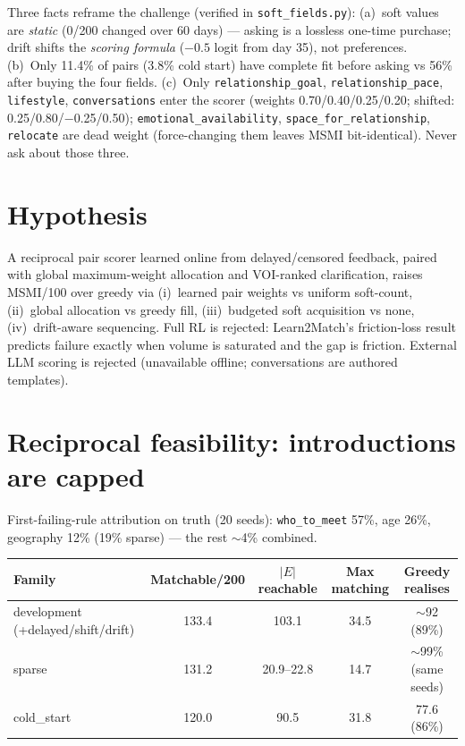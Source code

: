 \documentclass[11pt,a4paper]{article}
\begin{document}
Three facts reframe the challenge (verified in \texttt{soft\_fields.py}):
(a)~soft values are \emph{static} (0/200 changed over 60 days) --- asking is a
lossless one-time purchase; drift shifts the \emph{scoring formula} ($-0.5$
logit from day 35), not preferences. (b)~Only 11.4\% of pairs (3.8\% cold
start) have complete fit before asking vs 56\% after buying the four fields.
(c)~Only \texttt{relationship\_goal}, \texttt{relationship\_pace},
\texttt{lifestyle}, \texttt{conversations} enter the scorer (weights
0.70/0.40/0.25/0.20; shifted: 0.25/0.80/\textbf{$-$}0.25/0.50);
\texttt{emotional\_availability}, \texttt{space\_for\_relationship},
\texttt{relocate} are dead weight (force-changing them leaves MSMI
bit-identical). Never ask about those three.

\section{Hypothesis}
A reciprocal pair scorer learned online from delayed/censored feedback, paired
with global maximum-weight allocation and VOI-ranked clarification, raises
MSMI/100 over greedy via (i)~learned pair weights vs uniform soft-count,
(ii)~global allocation vs greedy fill, (iii)~budgeted soft acquisition vs
none, (iv)~drift-aware sequencing. Full RL is rejected: Learn2Match's
friction-loss result predicts failure exactly when volume is saturated and the
gap is friction. External LLM scoring is rejected (unavailable offline;
conversations are authored templates).

\section{Reciprocal feasibility: introductions are capped}
First-failing-rule attribution on truth (20 seeds): \texttt{who\_to\_meet}
57\%, age 26\%, geography 12\% (19\% sparse) --- the rest $\sim$4\% combined.

\begin{center}
\begin{tabular}{lcccc}
\toprule
Family & Matchable/200 & $|E|$ reachable & Max matching & Greedy realises \\
\midrule
development (+delayed/shift/drift) & 133.4 & 103.1 & 34.5 & $\sim$92 (89\%) \\
sparse & 131.2 & 20.9--22.8 & 14.7 & $\sim$99\% (same seeds) \\
cold\_start & 120.0 & 90.5 & 31.8 & 77.6 (86\%) \\
\bottomrule
\end{tabular}
\end{center}
\end{document}
